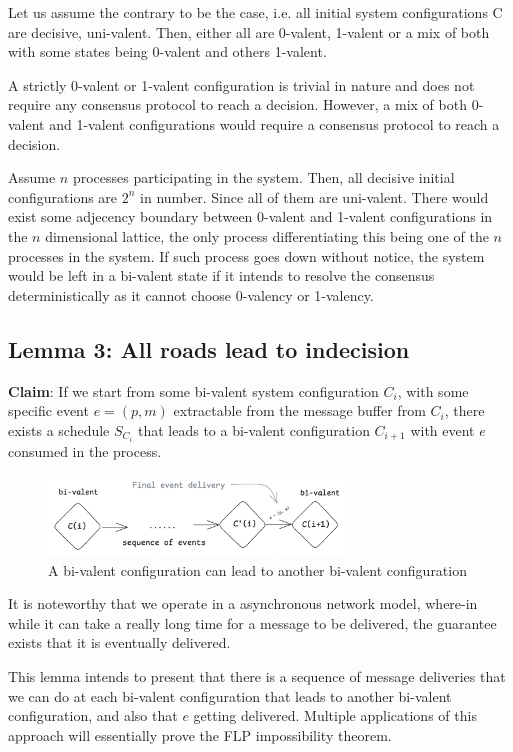 Let us assume the contrary to be the case, i.e. all initial system configurations C are decisive, uni-valent. Then, either all are 0-valent, 1-valent or a mix of both with some states being 0-valent and others 1-valent.

A strictly 0-valent or 1-valent configuration is trivial in nature and does not require any consensus protocol to reach a decision. However, a mix of both 0-valent and 1-valent configurations would require a consensus protocol to reach a decision.

Assume $n$ processes participating in the system. Then, all decisive initial configurations are $2^n$ in number. Since all of them are uni-valent. There would exist some adjecency boundary between 0-valent and 1-valent configurations in the $n$ dimensional lattice, the only process differentiating this being one of the $n$ processes in the system. If such process goes down without notice, the system would be left in a bi-valent state if it intends to resolve the consensus deterministically as it cannot choose 0-valency or 1-valency.

\subsection{Lemma 3: All roads lead to indecision}
\textbf{Claim}: If we start from some bi-valent system configuration $C_i$, with some specific event $e = (p, m)$ extractable from the message buffer from $C_i$, there exists a schedule $S_{C_i}$ that leads to a bi-valent configuration $C_{i+1}$ with event $e$ consumed in the process.

\begin{figure}[H]
    \centering
    \includegraphics[width=0.7\textwidth]{general-problems/assets/flp-sequence-bivalent-to-bivalent.png}
    \caption{A bi-valent configuration can lead to another bi-valent configuration}
    \label{fig:bivalent-to-bivalent}
\end{figure}

It is noteworthy that we operate in a asynchronous network model, where-in while it can take a really long time for a message to be delivered, the guarantee exists that it is eventually delivered.

This lemma intends to present that there is a sequence of message deliveries that we can do at each bi-valent configuration that leads to another bi-valent configuration, and also that $e$ getting delivered. Multiple applications of this approach will essentially prove the FLP impossibility theorem.

